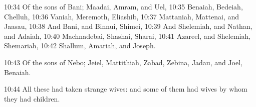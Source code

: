 10:34 Of the sons of Bani; Maadai, Amram, and Uel, 10:35 Benaiah,
Bedeiah, Chelluh, 10:36 Vaniah, Meremoth, Eliashib, 10:37 Mattaniah,
Mattenai, and Jaasau, 10:38 And Bani, and Binnui, Shimei, 10:39 And
Shelemiah, and Nathan, and Adaiah, 10:40 Machnadebai, Shashai, Sharai,
10:41 Azareel, and Shelemiah, Shemariah, 10:42 Shallum, Amariah, and
Joseph.

10:43 Of the sons of Nebo; Jeiel, Mattithiah, Zabad, Zebina, Jadau,
and Joel, Benaiah.

10:44 All these had taken strange wives: and some of them had wives by
whom they had children.

